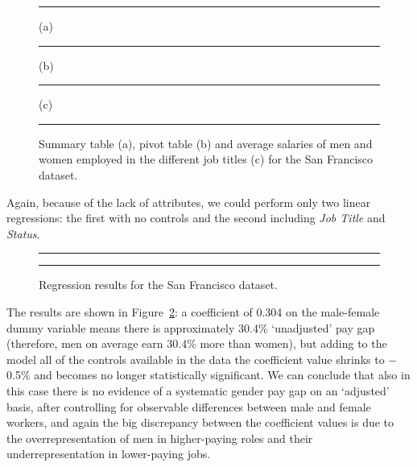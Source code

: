 \begin{figure}[t!]
\centering
\noindent\rule{\linewidth}{0.4pt}\par
\caption*{(a)}
\noindent\rule{\linewidth}{0.4pt}\par
\caption*{(b)}
\noindent\rule{\linewidth}{0.4pt}\par
\caption*{(c)}
\noindent\rule{\linewidth}{0.4pt}
\caption{Summary table (a), pivot table (b) and average salaries of men and women employed in the different job titles (c) for the San Francisco dataset.}
\label{fig:san_francisco_glassdoor1}
\end{figure}

Again, because of the lack of attributes, we could perform only two linear regressions: the first with no controls and the second including \textit{Job Title} and \textit{Status}.

\begin{figure}[t!]
\centering
\noindent\rule{\linewidth}{0.4pt}\par
\noindent\rule{\linewidth}{0.4pt}
\caption{Regression results for the San Francisco dataset.}
\label{fig:san_francisco_glassdoor2}
\end{figure}

The results are shown in Figure~\ref{fig:san_francisco_glassdoor2}: a coefficient of 0.304 on the male-female dummy variable means there is approximately 30.4\% `unadjusted' pay gap (therefore, men on average earn 30.4\% more than women), but adding to the model all of the controls available in the data the coefficient value shrinks to \(-\)0.5\% and becomes no longer statistically significant. We can conclude that also in this case there is no evidence of a systematic gender pay gap on an `adjusted' basis, after controlling for observable differences between male and female workers, and again the big discrepancy between the coefficient values is due to the overrepresentation of men in higher-paying roles and their underrepresentation in lower-paying jobs.


